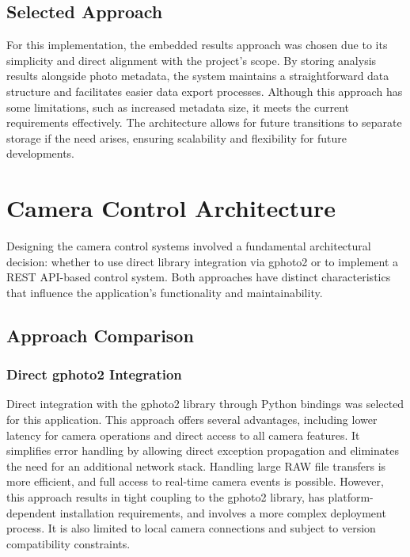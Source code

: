 \subsection{Selected Approach}

For this implementation, the embedded results approach was chosen due to its simplicity and direct alignment with the project's scope. By storing analysis results alongside photo metadata, the system maintains a straightforward data structure and facilitates easier data export processes. Although this approach has some limitations, such as increased metadata size, it meets the current requirements effectively. The architecture allows for future transitions to separate storage if the need arises, ensuring scalability and flexibility for future developments.

\section{Camera Control Architecture}

Designing the camera control systems involved a fundamental architectural decision: whether to use direct library integration via gphoto2 or to implement a REST API-based control system. Both approaches have distinct characteristics that influence the application's functionality and maintainability.

\subsection{Approach Comparison}

\subsubsection{Direct gphoto2 Integration}

Direct integration with the gphoto2 library through Python bindings was selected for this application. This approach offers several advantages, including lower latency for camera operations and direct access to all camera features. It simplifies error handling by allowing direct exception propagation and eliminates the need for an additional network stack. Handling large RAW file transfers is more efficient, and full access to real-time camera events is possible. However, this approach results in tight coupling to the gphoto2 library, has platform-dependent installation requirements, and involves a more complex deployment process. It is also limited to local camera connections and subject to version compatibility constraints.

